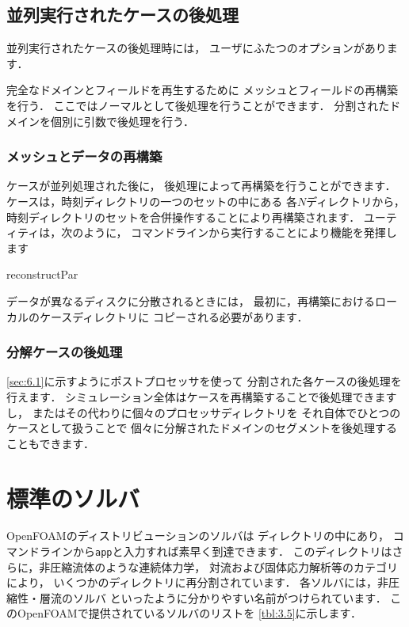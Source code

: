 \subsection{並列実行されたケースの後処理}
\label{ssec:3.4.4}
並列実行されたケースの後処理時には，
ユーザにふたつのオプションがあります．

完全なドメインとフィールドを再生するために
メッシュとフィールドの再構築を行う．
ここではノーマルとして後処理を行うことができます．
分割されたドメインを個別に引数で後処理を行う．

\subsubsection{メッシュとデータの再構築}
\label{sssec:3.4.4.1}
ケースが並列処理された後に，
後処理によって再構築を行うことができます．
ケースは，時刻ディレクトリの一つのセットの中にある
各$N$ディレクトリから，
時刻ディレクトリのセットを合併操作することにより再構築されます．
%
%
ユーティティは，次のように，
コマンドラインから実行することにより機能を発揮します
\begin{OFverbatim}[terminal]
reconstructPar
\end{OFverbatim}
データが異なるディスクに分散されるときには，
最初に，再構築におけるローカルのケースディレクトリに
コピーされる必要があります．

\subsubsection{分解ケースの後処理}
\label{sssec:3.4.4.2}
\autoref{sec:6.1}に示すようにポストプロセッサを使って
分割された各ケースの後処理を行えます．
シミュレーション全体はケースを再構築することで後処理できますし，
またはその代わりに個々のプロセッサディレクトリを
それ自体でひとつのケースとして扱うことで
個々に分解されたドメインのセグメントを後処理することもできます．



\section{標準のソルバ}
\label{sec:3.5}
OpenFOAMのディストリビューションのソルバは
ディレクトリの中にあり，
コマンドラインから\texttt{app}と入力すれば素早く到達できます．
このディレクトリはさらに，非圧縮流体のような連続体力学，
対流および固体応力解析等のカテゴリにより，
いくつかのディレクトリに再分割されています．
各ソルバには，非圧縮性・層流のソルバ
といったように分かりやすい名前がつけられています．
このOpenFOAMで提供されているソルバのリストを
\autoref{tbl:3.5}に示します．


